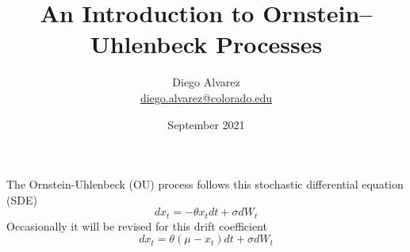 \documentclass{article}
\title{An Introduction to Ornstein–Uhlenbeck Processes}
\author{Diego Alvarez \\ \href{mailto:diego.alvarez@colorado.edu}{diego.alvarez@colorado.edu}}
\date{September 2021}
\begin{document}
\maketitle
\noindent
The Ornstein-Uhlenbeck (OU) process follows this stochastic differential equation (SDE)
$$
dx_t = -\theta x_t dt + \sigma dW_t
$$
Occasionally it will be revised for this drift coefficient
$$
dx_t = \theta (\mu - x_t) dt + \sigma dW_t
$$
\end{document}
